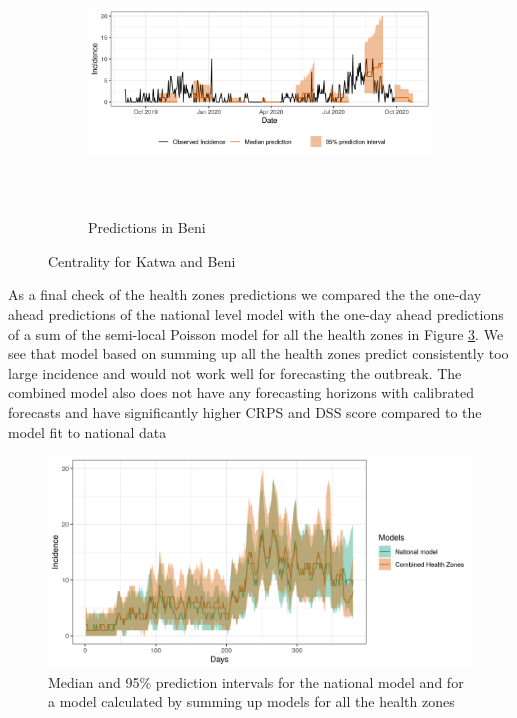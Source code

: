 \documentclass[12pt]{article}
\begin{document}
\begin{figure}[h!]
\begin{subfigure}{\textwidth} 
  \centering
  \includegraphics[width=0.9\linewidth, height=7cm]{../output/Beni_predictions.png}  
  \caption{Predictions in Beni}
  \label{fig:beni_katwa_4}
\end{subfigure}

\caption{Centrality for Katwa and Beni}

\label{fig:beni_katwa}
\end{figure}
As a final check of the health zones predictions we compared the the one-day ahead predictions of the national level model with the one-day ahead predictions of a sum of the semi-local Poisson model for all the health zones in Figure \ref{fig:nat_nat_comb}. We see that model based on summing up all the health zones predict consistently too large incidence and would not work well for forecasting the outbreak. The combined model also does not have any forecasting horizons with calibrated forecasts and have significantly higher CRPS and DSS score compared to the model fit to national data

\begin{figure}[h!]
  \centering
  \includegraphics[width=0.9\linewidth]{../output/nat_combined.png}
  \caption{Median and 95\% prediction intervals for the national model and for a model calculated by summing up models for all the health zones}
  \label{fig:nat_nat_comb}
  
\end{figure}
\end{document}
